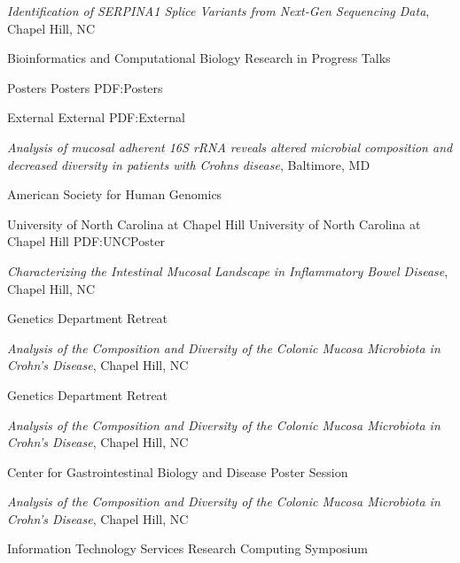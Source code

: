\documentclass[letterpaper,MMMyyyy,nonstopmode]{simpleresumecv}
\begin{document}
\begin{Body}
\BulletItem
\textit{Identification of SERPINA1 Splice Variants from Next-Gen Sequencing Data},\newline
Chapel Hill, NC
\hfill
{} 
\begin{Detail}
\Item
Bioinformatics and Computational Biology Research in Progress Talks
\end{Detail}

\Section
{Posters}
{Posters}
{PDF:Posters}

\BigGap
\SubSection
{External}
{External}
{PDF:External}

\BulletItem
\textit{Analysis of mucosal adherent 16S rRNA reveals altered microbial composition and
decreased diversity in patients with Crohns disease},\newline
Baltimore, MD
\hfill
{} 
\begin{Detail}
\Item
American Society for Human Genomics
\end{Detail}

\BigGap
\SubSection
{University of North Carolina at Chapel Hill}
{University of North Carolina at Chapel Hill}
{PDF:UNCPoster}

\BulletItem
\textit{Characterizing the Intestinal Mucosal Landscape in Inflammatory Bowel Disease},\newline
Chapel Hill, NC
\hfill
{} 
\begin{Detail}
\Item
Genetics Department Retreat
\end{Detail}

\BulletItem
\textit{Analysis of the Composition and Diversity of the Colonic Mucosa Microbiota in Crohn’s
Disease},\newline
Chapel Hill, NC
\hfill
{} 
\begin{Detail}
\Item
Genetics Department Retreat
\end{Detail}

\BulletItem
\textit{Analysis of the Composition and Diversity of the Colonic Mucosa Microbiota in Crohn’s
Disease},\newline
Chapel Hill, NC
\hfill
{} 
\begin{Detail}
\Item
Center for Gastrointestinal Biology and Disease Poster Session
\end{Detail}

\BulletItem
\textit{Analysis of the Composition and Diversity of the Colonic Mucosa Microbiota in Crohn’s
Disease},\newline
Chapel Hill, NC
\hfill
{} 
\begin{Detail}
\Item
Information Technology Services Research Computing Symposium
\end{Detail}


\end{Body}
\end{document}
